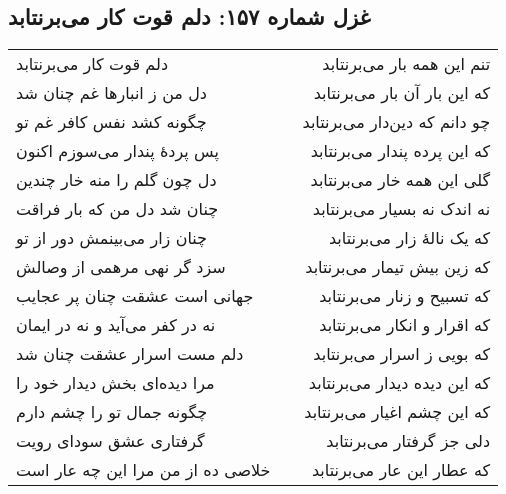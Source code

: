 \begin{center}
\section*{غزل شماره ۱۵۷: دلم قوت کار می‌برنتابد}
\label{sec:157}
\begin{longtable}{l p{0.5cm} r}
دلم قوت کار می‌برنتابد
&&
تنم این همه بار می‌برنتابد
\\
دل من ز انبارها غم چنان شد
&&
که این بار آن بار می‌برنتابد
\\
چگونه کشد نفس کافر غم تو
&&
چو دانم که دین‌دار می‌برنتابد
\\
پس پردهٔ پندار می‌سوزم اکنون
&&
که این پرده پندار می‌برنتابد
\\
دل چون گلم را منه خار چندین
&&
گلی این همه خار می‌برنتابد
\\
چنان شد دل من که بار فراقت
&&
نه اندک نه بسیار می‌برنتابد
\\
چنان زار می‌بینمش دور از تو
&&
که یک نالهٔ زار می‌برنتابد
\\
سزد گر نهی مرهمی از وصالش
&&
که زین بیش تیمار می‌برنتابد
\\
جهانی است عشقت چنان پر عجایب
&&
که تسبیح و زنار می‌برنتابد
\\
نه در کفر می‌آید و نه در ایمان
&&
که اقرار و انکار می‌برنتابد
\\
دلم مست اسرار عشقت چنان شد
&&
که بویی ز اسرار می‌برنتابد
\\
مرا دیده‌ای بخش دیدار خود را
&&
که این دیده دیدار می‌برنتابد
\\
چگونه جمال تو را چشم دارم
&&
که این چشم اغیار می‌برنتابد
\\
گرفتاری عشق سودای رویت
&&
دلی جز گرفتار می‌برنتابد
\\
خلاصی ده از من مرا این چه عار است
&&
که عطار این عار می‌برنتابد
\\
\end{longtable}
\end{center}
